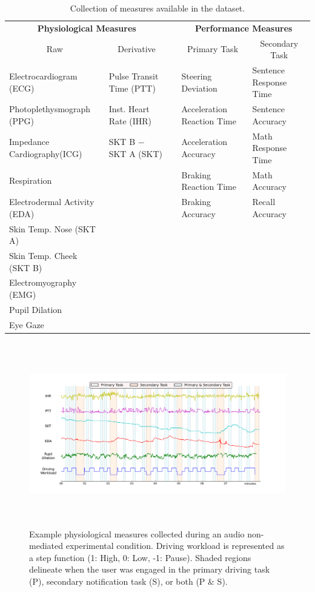 \renewcommand{\arraystretch}{1.1}
\begin{table}[ht]
\small
\centering
\begin{tabular} {@{}llcll@{}}\toprule
\multicolumn{2}{c}{\textbf{Physiological Measures}} &  \phantom{abc} & \multicolumn{2}{c}{\textbf{Performance Measures}} \\ 
\cmidrule{1-2} \cmidrule{4-5}
\multicolumn{1}{c}{Raw} & \multicolumn{1}{c}{Derivative} && \multicolumn{1}{c}{Primary Task} & \multicolumn{1}{c}{Secondary Task} \\ \midrule
Electrocardiogram (ECG) & Pulse Transit Time (PTT) && Steering Deviation & Sentence Response Time \\ 
Photoplethysmograph (PPG) & Inst. Heart Rate (IHR) && Acceleration Reaction Time & Sentence Accuracy \\ 
Impedance Cardiography(ICG) & SKT B $-$ SKT A (SKT) && Acceleration Accuracy & Math Response Time \\ 
Respiration  & && Braking Reaction Time & Math Accuracy  \\ 
Electrodermal Activity (EDA)  & &&  Braking Accuracy & Recall Accuracy \\ 
Skin Temp. Nose (SKT A) & &&  & \\ 
Skin Temp. Cheek (SKT B) & &&  & \\ 
Electromyography (EMG) & &&  & \\ 
Pupil Dilation  & &&  & \\ 
Eye Gaze &  &&  & \\
\bottomrule
\end{tabular}
\caption{Collection of measures available in the dataset.}
\label{table:measures}
\end{table}


\begin{figure}[th]
\centering
\includegraphics[height=8cm]{bwrepr}
\vspace{-1.5em}
\caption{Example physiological measures collected during an audio non-mediated experimental condition. Driving workload is represented as a step function (1: High, 0: Low, -1: Pause). Shaded regions delineate when the user was engaged in the primary driving task (P),  secondary notification task (S), or both (P \& S).}
\label{fig:snapshot}
\end{figure}

